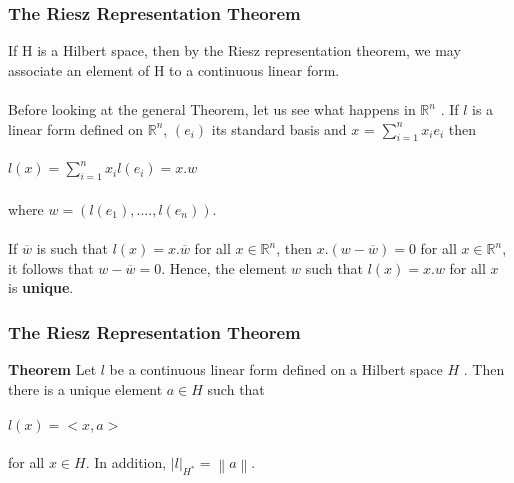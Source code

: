 \documentclass{beamer}
\newcommand{\R}{\mathbb{R}}
\newcommand\norm[1]{\left\lVert#1\right\rVert}
\begin{document}

\begin{frame}
\frametitle{The Riesz Representation Theorem}
If H is a Hilbert space, then by the Riesz representation theorem, we may associate an element of H to a continuous linear form.\\~\\

Before looking at the general Theorem, let us see what
happens in $\R^n$ . If $l$ is a linear form defined on $\R^n$, $(e_i)$ its standard basis and 
$x$ = $\sum_{i = 1}^{n} x_i e_i$ then \\~\\

\hspace{2cm} $l(x) = \sum_{i=1}^{n} x_i l(e_i) = x . w$\\~\\
where $w = (l(e_1), ...., l(e_n))$.\\~\\

If $\overline{w}$ is such that $l(x) = x. \overline{w}$ for all $x \in \R^n$, then $x.(w - \overline{w}) = 0$ for all $x \in \R^n$, it follows that $ w - \overline{w} = 0$. Hence, the element $w$ such that $l(x) = x.w$ for all $x$ is \textbf{unique}.

\end{frame}


\begin{frame}
\frametitle{The Riesz Representation Theorem}

\textbf{Theorem} Let $l$ be a continuous linear form defined on a Hilbert space $H$ . Then there is a unique element $a \in  H$ such that \\~\\

\hspace{3cm} $l(x) = <x, a>$ \\~\\

for all $x \in H$. In addition, $|l|_{H^{*}} = \norm{a}$. \\



\end{frame}
\end{document}
